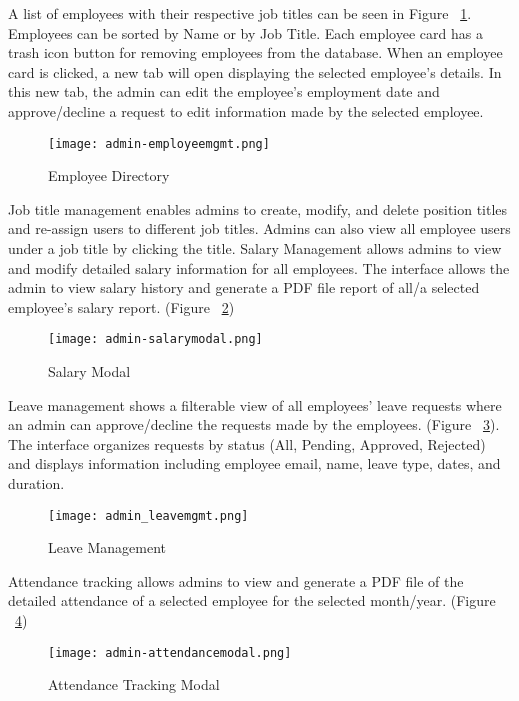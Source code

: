 \documentclass[journal]{./IEEE/IEEEtran}
\begin{document}
A list of employees with their respective job titles can be seen in Figure ~\ref{fig:ed}. Employees can be sorted by Name or by Job Title. Each employee card has a trash icon button for removing employees from the database. When an employee card is clicked, a new tab will open displaying the selected employee's details. In this new tab, the admin can edit the employee's employment date and approve/decline a request to edit information made by the selected employee.
    \begin{figure}[H]
        \centering
        \texttt{[image: admin-employeemgmt.png]}
        \caption{Employee Directory}
        \label{fig:ed}
    \end{figure}

Job title management enables admins to create, modify, and delete position titles and re-assign users to different job titles. Admins can also view all employee users under a job title by clicking the title. Salary Management allows admins to view and modify detailed salary information for all employees. The interface allows the admin to view salary history and generate a PDF file report of all/a selected employee's salary report. (Figure ~\ref{fig:ad-slrymdl})
\begin{figure}[H]
    \centering
    \texttt{[image: admin-salarymodal.png]}
    \caption{Salary Modal}
    \label{fig:ad-slrymdl}
\end{figure}

Leave management shows a filterable view of all employees' leave requests where an admin can approve/decline the requests made by the employees. (Figure ~\ref{fig:ad-leavemgmt}). The interface organizes requests by status (All, Pending, Approved, Rejected) and displays information including employee email, name, leave type, dates, and duration.

\begin{figure}[H]
    \centering
    \texttt{[image: admin\_leavemgmt.png]}
    \caption{Leave Management}
    \label{fig:ad-leavemgmt}
\end{figure}

Attendance tracking allows admins to view and generate a PDF file of the detailed attendance of a selected employee for the selected month/year. (Figure ~\ref{fig:ad-attndncemdl})
\begin{figure}[H]
    \centering
    \texttt{[image: admin-attendancemodal.png]}
    \caption{Attendance Tracking Modal}
    \label{fig:ad-attndncemdl}
\end{figure}
\end{document}
